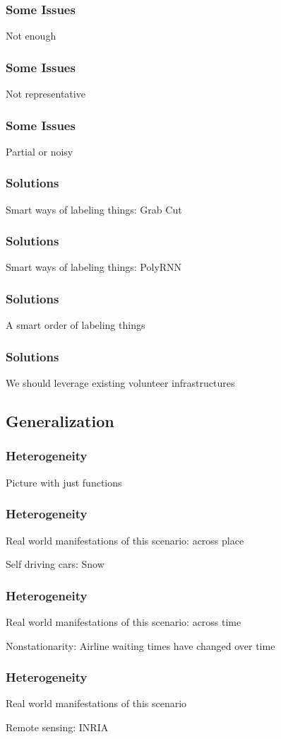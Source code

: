 \documentclass[10pt,mathserif]{beamer}
\begin{document}
\begin{frame}
  \frametitle{Some Issues}
  Not enough
\end{frame}

\begin{frame}
  \frametitle{Some Issues}
  Not representative
\end{frame}

\begin{frame}
  \frametitle{Some Issues}
  Partial or noisy
\end{frame}

\begin{frame}
  \frametitle{Solutions}
  Smart ways of labeling things: Grab Cut
\end{frame}

\begin{frame}
  \frametitle{Solutions}
  Smart ways of labeling things: PolyRNN
\end{frame}

\begin{frame}
  \frametitle{Solutions}
  A smart order of labeling things
\end{frame}

\begin{frame}
  \frametitle{Solutions}
  We should leverage existing volunteer infrastructures
\end{frame}

\subsection{Generalization}
\label{subsec:label}

\begin{frame}
  \frametitle{Heterogeneity}
  Picture with just functions
\end{frame}

\begin{frame}
  \frametitle{Heterogeneity}
  Real world manifestations of this scenario: across place

  Self driving cars: Snow
\end{frame}

\begin{frame}
  \frametitle{Heterogeneity}
  Real world manifestations of this scenario: across time

  Nonstationarity: Airline waiting times have changed over time
\end{frame}

\begin{frame}
  \frametitle{Heterogeneity}
  Real world manifestations of this scenario

  Remote sensing: INRIA
\end{frame}
\end{document}
